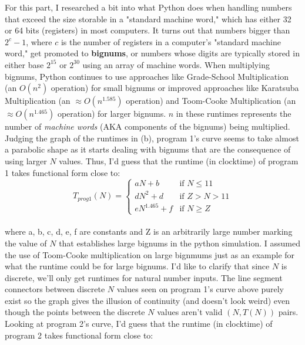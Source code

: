 \documentclass[11pt]{article}
\begin{document}
\begin{enumerate}
\begin{enumerate}
    For this part, I researched a bit into what Python does when handling numbers that exceed the size storable in a "standard machine word," which has either 32 or 64 bits (registers) in most computers. It turns out that numbers bigger than $2^c - 1$, where $c$ is the number of registers in a computer's "standard machine word," get promoted to \textbf{bignums}, or numbers whose digits are typically stored in either base $2^{15}$ or $2^{30}$ using an array of machine words.
    When multiplying bignums, Python continues to use approaches like Grade-School Multiplication (an $O(n^2)$ operation) for small bignums or improved approaches like Karatsuba Multiplication (an $\approx O(n^{1.585})$ operation) and Toom-Cooke Multiplication (an $\approx O(n^{1.465})$ operation) for larger bignums. $n$ in these runtimes represents the number of \textit{machine words} (AKA components of the bignums) being multiplied.\\

    Judging the graph of the runtimes in (b), program 1's curve seems to take almost a parabolic shape as it starts dealing with bignums that are the consequence of using larger $N$ values. Thus, I'd guess that the runtime (in clocktime) of program 1 takes functional form close to: \\
        
        \[
        T_{prog1}(N) =
        \begin{cases} 
            aN + b & \text{if } N \leq 11 \\
            dN^2 + d& \text{if } Z > N > 11 \\
            eN^{1.465} + f& \text{if } N \geq Z
        \end{cases}
        \] \\

        where a, b, c, d, e, f are constants and Z is an arbitrarily large number marking the value of $N$ that establishes large bignums in the python simulation. I assumed the use of Toom-Cooke multiplication on large bignmums just as an example for what the runtime could be for large bignums. I'd like to clarify that since $N$ is discrete, we'll only get runtimes for natural number inputs. The line segment connectors between discrete $N$ values seen on program 1's curve above purely exist so the graph gives the illusion of continuity (and doesn't look weird) even though the points between the discrete $N$ values aren't valid $(N, T(N))$ pairs. \\

    Looking at program 2's curve, I'd guess that the runtime (in clocktime) of program 2 takes functional form close to:


\end{enumerate}
\end{enumerate}
\end{document}
